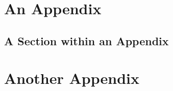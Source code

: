 \begin{thesisappendices}

\chapter{An Appendix}\label{app: title of Appendix A}

    \section{A Section within an Appendix}

    \lipsum[1]
	
\chapter{Another Appendix}

    \lipsum[1]
	
\end{thesisappendices}